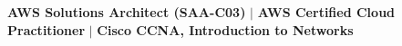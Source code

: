 
{\footnotesize
\textbf{AWS Solutions Architect (SAA-C03)} \quad $|$ \quad \textbf{AWS Certified Cloud Practitioner} \quad $|$ \quad \textbf{Cisco CCNA, Introduction to Networks}
}
\vspace{0.2em}
